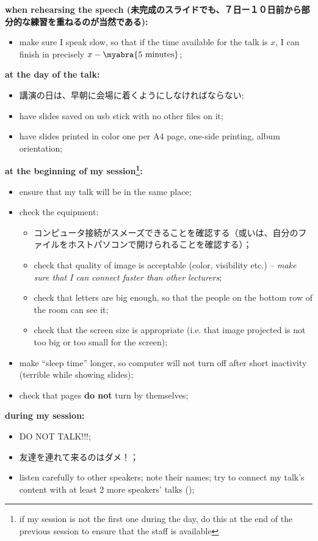 \documentclass[12pt]{article} %
\begin{document}
    \textbf{when rehearsing the speech (未完成のスライドでも、７日ー１０日前から部分的な練習を重ねるのが当然である):}
	\begin{itemize}
		\item make sure I speak slow, so that if the time available for the talk is $x$, I can finish in precisely $x-\myabra{\mbox{5 minutes}}$;
	\end{itemize}
	\textbf{at the day of the talk:}
	\begin{itemize}
		\item 講演の日は、早朝に会場に着くようにしなければならない;
		\item have slides saved on usb stick with no other files on it;
		\item have slides printed in color one per A4 page, one-side printing, album orientation;
	\end{itemize}
	\textbf{at the beginning of my session\footnote{\normalfont if my session is not the first one during the day, do this at the end of the previous session to ensure that
	the staff is available}:}
	\begin{itemize}
		\item ensure that my talk will be in the same place;
		\item check the equipment:\begin{itemize}
				\item コンピュータ接続がスメーズできることを確認する（或いは、自分のファイルをホストパソコンで開けられることを確認する）；
				\item check that quality of image is acceptable (color, visibility etc.) -- \textit{make sure that I can connect faster than other lecturers};
				\item check that letters are big enough, so that the people on the bottom row of the room can see it;
				\item check that the screen size is appropriate (i.e. that image projected is not too big or too small for the screen);
			\end{itemize}
		\item make ``sleep time'' longer, so computer will not turn off after short inactivity (terrible while showing slides);
		\item check that pages {\bf do not} turn by themselves;
	\end{itemize}
	\textbf{during my session:}
	\begin{itemize}
		\item DO NOT TALK!!!;
		\item 友達を連れて来るのはダメ！；
		\item listen carefully to other speakers; note their names; try to connect my talk's content with at least 2 more speakers' talks ();
	\end{itemize}
\end{document}
